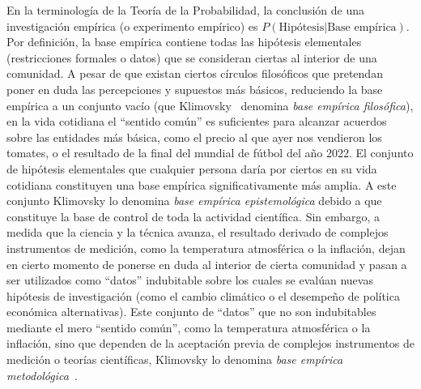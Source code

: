\documentclass[a4paper,11pt]{book}
\theoremstyle{definition}
\begin{document}

En la terminolog\'ia de la Teor\'ia de la Probabilidad, la conclusi\'on de una investigaci\'on emp\'irica (o experimento emp\'irico) es $P(\text{Hip\'otesis}|\text{Base emp\'irica})$.
%
Por definici\'on, la base emp\'irica contiene todas las hip\'otesis elementales (restricciones formales o datos) que se consideran ciertas al interior de una comunidad.
%
A pesar de que existan ciertos c\'irculos filos\'oficos que pretendan poner en duda las percepciones y supuestos m\'as b\'asicos, reduciendo la base emp\'irica a un conjunto vac\'io (que Klimovsky~\cite{klimovsky1994-desventuras} denomina \emph{base emp\'irica filos\'ofica}), en la vida cotidiana el ``sentido com\'un'' es suficientes para alcanzar acuerdos sobre las entidades m\'as b\'asica, como el precio al que ayer nos vendieron los tomates, o el resultado de la final del mundial de f\'utbol del a\~no 2022.
%
El conjunto de hip\'otesis elementales que cualquier persona dar\'ia por ciertos en su vida cotidiana constituyen una base emp\'irica significativamente m\'as amplia.
%
A este conjunto Klimovsky lo denomina \emph{base emp\'irica epistemol\'ogica} debido a que constituye la base de control de toda la actividad cient\'ifica.
%
Sin embargo, a medida que la ciencia y la t\'ecnica avanza, el resultado derivado de complejos instrumentos de medici\'on, como la temperatura atmosf\'erica o la inflaci\'on, dejan en cierto momento de ponerse en duda al interior de cierta comunidad y pasan a ser utilizados como ``datos'' indubitable sobre los cuales se eval\'uan nuevas hip\'otesis de investigaci\'on (como el cambio clim\'atico o el desempe\~no de pol\'itica econ\'omica alternativas).
%
Este conjunto de ``datos'' que no son indubitables mediante el mero ``sentido com\'un'', como la temperatura atmosf\'erica o la inflaci\'on, sino que dependen de la aceptaci\'on previa de complejos instrumentos de medici\'on o teor\'ias cient\'ificas, Klimovsky lo denomina \emph{base emp\'irica metodol\'ogica}~\cite{klimovsky1994-desventuras}.

\end{document}
